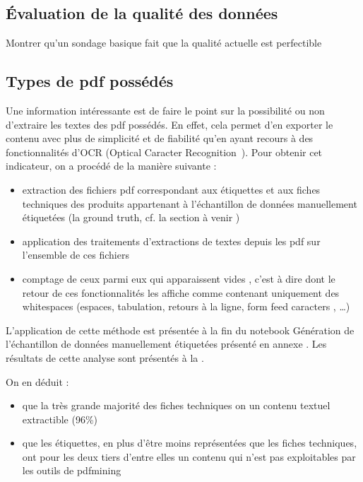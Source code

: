             \subsection{\'{E}valuation de la qualité des données}
        Montrer qu'un sondage basique fait que la qualité actuelle est perfectible


            \subsection{Types de pdf possédés}

            Une information intéressante est de faire le point sur la possibilité ou non d'extraire les textes des pdf possédés.
            En effet, cela permet d'en exporter le contenu avec plus de simplicité et de fiabilité qu'en ayant recours à des fonctionnalités d'OCR (Optical Caracter Recognition~\cite{OCR_wiki}).
            Pour obtenir cet indicateur, on a procédé de la manière suivante : 
            \begin{itemize}
                \item extraction des fichiers pdf correspondant aux étiquettes et aux fiches techniques des produits appartenant à l'échantillon de données manuellement étiquetées (la ground truth, cf. la section à venir )
                \item application des traitements d'extractions de textes depuis les pdf sur l'ensemble de ces fichiers
                \item comptage de ceux parmi eux qui apparaissent \og vides \fg, c'est à dire dont le retour de ces fonctionnalités les affiche comme contenant uniquement des whitespaces (espaces, tabulation, retours à la ligne, \og form feed caracters \fg, \dots)
            \end{itemize}
            L'application de cette méthode est présentée à la fin du notebook \og Génération de l'échantillon de données manuellement étiquetées \fg présenté en annexe .
            Les résultats de cette analyse sont présentés à la .
            
            On en déduit :
            ~\begin{itemize}
                \item que la très grande majorité des fiches techniques on un contenu textuel extractible (96\%)
                \item que les étiquettes, en plus d'être moins représentées que les fiches techniques, ont pour les deux tiers d'entre elles un contenu qui n'est pas exploitables par les outils de pdfmining
            \end{itemize}
